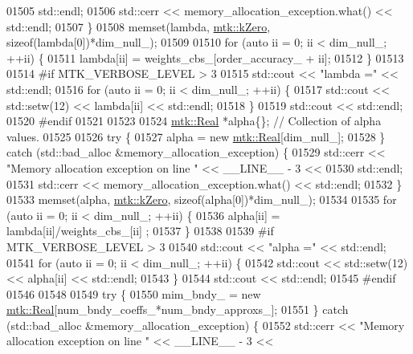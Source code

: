 \begin{DoxyCode}
{{01505       std::endl;
01506     std::cerr << memory\_allocation\_exception.what() << std::endl;
01507   \}
01508   memset(lambda, \hyperlink{group__c01-roots_ga59a451a5fae30d59649bcda274fea271}{mtk::kZero}, \textcolor{keyword}{sizeof}(lambda[0])*dim\_null\_);
01509 
01510   \textcolor{keywordflow}{for} (\textcolor{keyword}{auto} ii = 0; ii < dim\_null\_; ++ii) \{
01511     lambda[ii] = weights\_cbs\_[order\_accuracy\_ + ii];
01512   \}
01513 
01514 \textcolor{preprocessor}{  #if MTK\_VERBOSE\_LEVEL > 3}
01515   std::cout << \textcolor{stringliteral}{"lambda ="} << std::endl;
01516   \textcolor{keywordflow}{for} (\textcolor{keyword}{auto} ii = 0; ii < dim\_null\_; ++ii) \{
01517     std::cout << std::setw(12) << lambda[ii] << std::endl;
01518   \}
01519   std::cout << std::endl;
01520 \textcolor{preprocessor}{  #endif}
01521 
01523 
01524   \hyperlink{group__c01-roots_gac080bbbf5cbb5502c9f00405f894857d}{mtk::Real} *alpha\{\}; \textcolor{comment}{// Collection of alpha values.}
01525 
01526   \textcolor{keywordflow}{try} \{
01527     alpha = \textcolor{keyword}{new} \hyperlink{group__c01-roots_gac080bbbf5cbb5502c9f00405f894857d}{mtk::Real}[dim\_null\_];
01528   \} \textcolor{keywordflow}{catch} (std::bad\_alloc &memory\_allocation\_exception) \{
01529     std::cerr << \textcolor{stringliteral}{"Memory allocation exception on line "} << \_\_LINE\_\_ - 3 <<
01530       std::endl;
01531     std::cerr << memory\_allocation\_exception.what() << std::endl;
01532   \}
01533   memset(alpha, \hyperlink{group__c01-roots_ga59a451a5fae30d59649bcda274fea271}{mtk::kZero}, \textcolor{keyword}{sizeof}(alpha[0])*dim\_null\_);
01534 
01535   \textcolor{keywordflow}{for} (\textcolor{keyword}{auto} ii = 0; ii < dim\_null\_; ++ii) \{
01536     alpha[ii] = lambda[ii]/weights\_cbs\_[ii] ;
01537   \}
01538 
01539 \textcolor{preprocessor}{  #if MTK\_VERBOSE\_LEVEL > 3}
01540   std::cout << \textcolor{stringliteral}{"alpha ="} << std::endl;
01541   \textcolor{keywordflow}{for} (\textcolor{keyword}{auto} ii = 0; ii < dim\_null\_; ++ii) \{
01542     std::cout << std::setw(12) << alpha[ii] << std::endl;
01543   \}
01544   std::cout << std::endl;
01545 \textcolor{preprocessor}{  #endif}
01546 
01548 
01549   \textcolor{keywordflow}{try} \{
01550     mim\_bndy\_ = \textcolor{keyword}{new} \hyperlink{group__c01-roots_gac080bbbf5cbb5502c9f00405f894857d}{mtk::Real}[num\_bndy\_coeffs\_*num\_bndy\_approxs\_];
01551   \} \textcolor{keywordflow}{catch} (std::bad\_alloc &memory\_allocation\_exception) \{
01552     std::cerr << \textcolor{stringliteral}{"Memory allocation exception on line "} << \_\_LINE\_\_ - 3 <<
}}
\end{DoxyCode}
